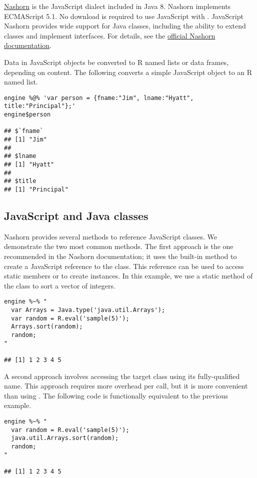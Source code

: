 \href{https://docs.oracle.com/javase/8/docs/technotes/guides/scripting/nashorn/}{Nashorn} is the JavaScript dialect included in Java 8. Nashorn implements ECMAScript 5.1. No download is required to use JavaScript with . JavaScript Nashorn provides wide support for Java classes, including the ability to extend classes and implement interfaces. For details, see the \href{https://docs.oracle.com/javase/8/docs/technotes/guides/scripting/nashorn/}{official Nashorn documentation}.

Data in JavaScript objects be converted to R named lists or data frames, depending on content. The following converts a simple JavaScript object to an R named list.

\begin{verbatim}
engine %@% 'var person = {fname:"Jim", lname:"Hyatt", title:"Principal"};'
engine$person

## $`fname`
## [1] "Jim"
## 
## $lname
## [1] "Hyatt"
## 
## $title
## [1] "Principal"
\end{verbatim}

\subsection{JavaScript and Java classes}

Nashorn provides several methods to reference JavaScript classes. We demonstrate the two most common methods. The first approach is the one recommended in the Nashorn documentation; it uses the built-in  method to create a JavaScript reference to the class. This reference can be used to access static members or to create instances. In this example, we use a static method of the  class to sort a vector of integers.

\begin{verbatim}
engine %~% "
  var Arrays = Java.type('java.util.Arrays');
  var random = R.eval('sample(5)');
  Arrays.sort(random);
  random;
"

## [1] 1 2 3 4 5
\end{verbatim}

A second approach involves accessing the target class using its fully-qualified name. This approach requires more overhead per call, but it is more convenient than using . The following code is functionally equivalent to the previous example.

\begin{verbatim}
engine %~% "
  var random = R.eval('sample(5)');
  java.util.Arrays.sort(random);
  random;
"

## [1] 1 2 3 4 5
\end{verbatim}


